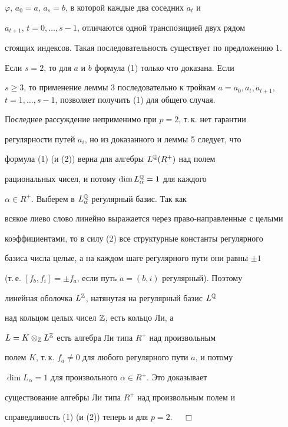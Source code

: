 $\varphi$, $a_0=a$, $a_s=b$, в которой каждые два соседних $a_t$ и


$a_{t+1}$, $t=0,\dotsc,s-1$, отличаются одной транспозицией двух рядом


стоящих индексов. Такая последовательность существует по предложению 1.


Если $s=2$, то для $a$ и $b$ формула (1) только что доказана. Если


$s\ge 3$, то применение леммы 3 последовательно к тройкам $a=a_0,


a_t,a_{t+1}$, $t=1,\dotsc,s-1$, позволяет получить (1) для общего случая.





Последнее рассуждение неприменимо при $p=2$, т.\,к. нет гарантии


регулярности путей $a_i$, но из доказанного и леммы 5 следует, что


формула (1) (и (2)) верна для алгебры $L^{\Bbb Q}(R^+)$ над полем


рациональных чисел, и потому $\dim L^{\Bbb Q}_\alpha=1$ для каждого


$\alpha\in R^+$. Выберем в $L^{\Bbb Q}_\alpha$ регулярный базис. Так как


всякое лиево слово линейно выражается через право-направленные с целыми


коэффициентами, то в силу (2) все структурные константы регулярного


базиса числа целые, а на каждом шаге регулярного пути они равны $\pm1$


(т.\,е. $[f_b,f_i]=\pm f_a$, если путь $a=(b,i)$ регулярный). Поэтому


линейная оболочка $L^{\Bbb Z}$, натянутая на регулярный базис $L^{\Bbb Q}$


над кольцом целых чисел $\Bbb Z$, есть кольцо Ли, а


$L=K\otimes_{\Bbb Z}L^{\Bbb Z}$ есть алгебра Ли типа $R^+$ над произвольным


полем $K$, т.\,к. $f_a\ne 0$ для любого регулярного пути $a$, и потому


$\dim L_\alpha=1$ для произвольного $\alpha\in R^+$. Это доказывает


существование алгебры Ли типа $R^+$ над произвольным полем и


справедливость (1) (и (2)) теперь и для $p=2$. $\quad\Box$


\medskip





